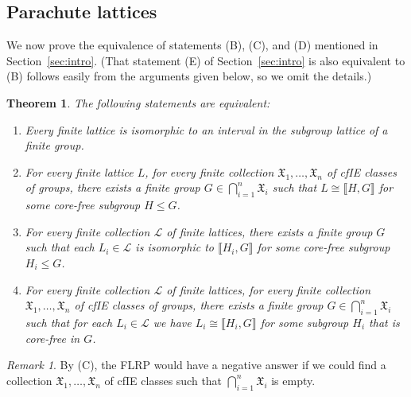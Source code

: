 \documentclass{gen-j-l}
\newcommand{\lb}{\ensuremath{\llbracket}}
\newcommand{\rb}{\ensuremath{\rrbracket}}
\newcommand{\<}{\ensuremath{\langle}}
\renewcommand{\>}{\ensuremath{\rangle}}
\theoremstyle{plain}
\newtheorem{theorem}{Theorem}[section]
\theoremstyle{definition}
\theoremstyle{remark}
\newtheorem*{remark}{Remark}
\numberwithin{theorem}{section}
\numberwithin{claim}{section}
\numberwithin{equation}{section}
\numberwithin{conjecture}{section}
\renewcommand{\leq}{\ensuremath{\leqslant}}
\newcommand{\core}{\ensuremath{\operatorname{core}}}
\newcommand{\2}{\ensuremath{\mathbf{2}}}
\newcommand{\3}{\ensuremath{\mathbf{3}}}
\newcommand{\sG}{\ensuremath{\mathfrak{X}}}
\newcommand{\sL}{\ensuremath{\mathscr{L}}}
\begin{document}
\subsection{Parachute lattices}
\label{sec:parachute-lattices}
We now prove the equivalence of statements (B), (C), 
and (D) mentioned in Section~\ref{sec:intro}.  
(That statement (E) of Section~\ref{sec:intro} is also equivalent to (B) follows
easily from the arguments given below, so we omit the details.)
\begin{theorem}
\label{thm-wjd-1}
The following statements are equivalent:
\begin{enumerate}
\item[(B)] Every finite lattice is isomorphic to
  an interval in the subgroup lattice of a finite group.
\item[(C)]
For every finite lattice $L$, for every finite collection $\sG_1, \dots, \sG_n$
of \acs{cfIE} classes of groups,
there exists a finite group $G \in \bigcap\limits_{i=1}^n \sG_i$ such that $L \cong
\lb H,G \rb$ for some core-free subgroup $H\leq G$. %

\item[(D)]
For every finite collection $\sL$ of finite lattices, there exists a finite
group $G$ such that each $L_i \in \sL$ is isomorphic to $\lb H_i, G \rb$ for some
core-free subgroup $H_i\leq G$.

\item[(E)]
For every finite collection $\sL$ of finite lattices, for every finite collection $\sG_1, \dots, \sG_n$
of \acs{cfIE} classes of groups,
there exists a finite group $G \in \bigcap\limits_{i=1}^n \sG_i$ such that for
each $L_i \in \sL$ we have $L_i\cong \lb H_i, G \rb$ for some subgroup
$H_i$ that is core-free in $G$. %
\end{enumerate}
\end{theorem}
\begin{remark}
By (C), the \acs{FLRP} would have a negative answer if we
could find a collection $\sG_1, \dots, \sG_n$ of \acs{cfIE} classes
such that $\bigcap\limits_{i=1}^n \sG_i$ is empty.
\end{remark}
\end{document}
